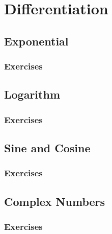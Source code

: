 \setcounter{chapter}{0}
\renewcommand{\thechapter}{4}
\chapter{Differentiation}\label{ch:4}
\setcounter{equation}{0}	        %

\section{Exponential}\label{sec:4.1}
\subsection*{Exercises}\label{sec:4.1_Exercises}
\section{Logarithm}\label{sec:4.2}	
\subsection*{Exercises}\label{sec:4.2_Exercises}
\section{Sine and Cosine}\label{sec:4.3}	
\subsection*{Exercises}\label{sec:4.3_Exercises}
\section{Complex Numbers}\label{sec:4.4}	
\subsection*{Exercises}\label{sec:4.4_Exercises}
